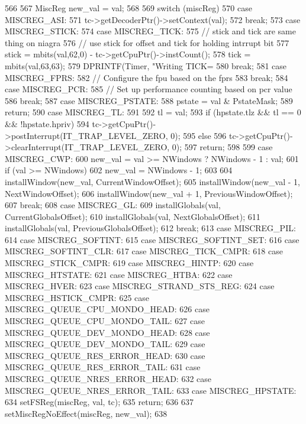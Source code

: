 \begin{DoxyCode}
566 {
567     MiscReg new_val = val;
568 
569     switch (miscReg) {
570       case MISCREG_ASI:
571         tc->getDecoderPtr()->setContext(val);
572         break;
573       case MISCREG_STICK:
574       case MISCREG_TICK:
575         // stick and tick are same thing on niagra
576         // use stick for offset and tick for holding intrrupt bit
577         stick = mbits(val,62,0) - tc->getCpuPtr()->instCount();
578         tick = mbits(val,63,63);
579         DPRINTF(Timer, "Writing TICK=%
580         break;
581       case MISCREG_FPRS:
582         // Configure the fpu based on the fprs
583         break;
584       case MISCREG_PCR:
585         // Set up performance counting based on pcr value
586         break;
587       case MISCREG_PSTATE:
588         pstate = val & PstateMask;
589         return;
590       case MISCREG_TL:
591         {
592             tl = val;
593             if (hpstate.tlz && tl == 0 && !hpstate.hpriv)
594                 tc->getCpuPtr()->postInterrupt(IT_TRAP_LEVEL_ZERO, 0);
595             else
596                 tc->getCpuPtr()->clearInterrupt(IT_TRAP_LEVEL_ZERO, 0);
597             return;
598         }
599       case MISCREG_CWP:
600         new_val = val >= NWindows ? NWindows - 1 : val;
601         if (val >= NWindows)
602             new_val = NWindows - 1;
603 
604         installWindow(new_val, CurrentWindowOffset);
605         installWindow(new_val - 1, NextWindowOffset);
606         installWindow(new_val + 1, PreviousWindowOffset);
607         break;
608       case MISCREG_GL:
609         installGlobals(val, CurrentGlobalsOffset);
610         installGlobals(val, NextGlobalsOffset);
611         installGlobals(val, PreviousGlobalsOffset);
612         break;
613       case MISCREG_PIL:
614       case MISCREG_SOFTINT:
615       case MISCREG_SOFTINT_SET:
616       case MISCREG_SOFTINT_CLR:
617       case MISCREG_TICK_CMPR:
618       case MISCREG_STICK_CMPR:
619       case MISCREG_HINTP:
620       case MISCREG_HTSTATE:
621       case MISCREG_HTBA:
622       case MISCREG_HVER:
623       case MISCREG_STRAND_STS_REG:
624       case MISCREG_HSTICK_CMPR:
625       case MISCREG_QUEUE_CPU_MONDO_HEAD:
626       case MISCREG_QUEUE_CPU_MONDO_TAIL:
627       case MISCREG_QUEUE_DEV_MONDO_HEAD:
628       case MISCREG_QUEUE_DEV_MONDO_TAIL:
629       case MISCREG_QUEUE_RES_ERROR_HEAD:
630       case MISCREG_QUEUE_RES_ERROR_TAIL:
631       case MISCREG_QUEUE_NRES_ERROR_HEAD:
632       case MISCREG_QUEUE_NRES_ERROR_TAIL:
633       case MISCREG_HPSTATE:
634         setFSReg(miscReg, val, tc);
635         return;
636     }
637     setMiscRegNoEffect(miscReg, new_val);
638 }
\end{DoxyCode}
